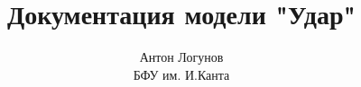 \documentclass[a4paper,11pt]{article}
\begin{document}
 \title{Документация модели "Удар"}
 \author{Антон Логунов \\ БФУ им. И.Канта}
 \renewcommand{\today}{Сентябрь 14, 2012}
 \maketitle
 
 

 

 
\end{document}
